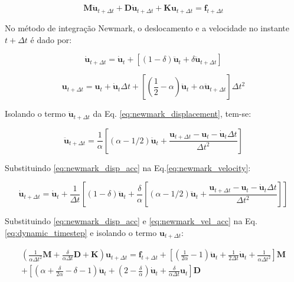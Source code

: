 \begin{equation} \label{eq:dynamic_timestep}
\pmb{M}\ddot{\pmb{u}}_{t + \Delta t} + \pmb{D}\dot{\pmb{u}}_{t + \Delta t} + \pmb{K}\pmb{u}_{t + \Delta t} = \pmb{f}_{t + \Delta t}
\end{equation}

No método de integração Newmark, o deslocamento e a velocidade no instante $t + \Delta t$ é dado por:

\begin{equation}\label{eq:newmark_velocity}
\dot{\pmb{u}}_{t + \Delta t} = \dot{\pmb{u}}_{t} + \left[\left(1 - \delta\right)\ddot{\pmb{u}}_{t} + \delta \ddot{\pmb{u}}_{t + \Delta t} \right]
\end{equation}

 \begin{equation}\label{eq:newmark_displacement}
\pmb{u}_{t + \Delta t} = \pmb{u}_{t} + \dot{\pmb{u}}_{t}\Delta t + \left[\left(\frac{1}{2} - \alpha\right) \ddot{\pmb{u}}_{t} + \alpha \ddot{\pmb{u}}_{t + \Delta  t}\right] \Delta t^{2}
\end{equation}

Isolando o termo $\ddot{\pmb{u}}_{t+\Delta t}$ da Eq. \ref{eq:newmark_displacement}, tem-se:

\begin{equation}\label{eq:newmark_disp_acc}
\ddot{\pmb{u}}_{t + \Delta t} = \frac{1}{\alpha}\left[\left(\alpha - 1/2\right)\ddot{\pmb{u}}_t + \frac{\pmb{u}_{t + \Delta t} - \pmb{u}_{t} - \dot{\pmb{u}}_{t}\Delta t }{\Delta t^{2}}\right]
\end{equation}

Substituindo \ref{eq:newmark_disp_acc} na Eq.\ref{eq:newmark_velocity}:

\begin{equation}\label{eq:newmark_vel_acc}
\dot{\pmb{u}}_{t + \Delta t} = \dot{\pmb{u}}_{t} + \frac{1}{\Delta t}\left[\left(1-\delta\right)\ddot{\pmb{u}}_{t} + \frac{\delta}{\alpha}\left[\left(\alpha - 1/2\right)\ddot{\pmb{u}}_{t} + \frac{\pmb{u}_{t + \Delta t} - \pmb{u}_{t} - \dot{\pmb{u}}_{t}\Delta t }{\Delta t^{2}} \right]\right]
\end{equation}

Substituindo \ref{eq:newmark_disp_acc} e \ref{eq:newmark_vel_acc} na Eq.\ref{eq:dynamic_timestep} e isolando o termo $\pmb{u}_{t + \Delta t}$:

\begin{equation}\label{eq:newmark_geral}
\begin{split}
\left(\frac{1}{\alpha \Delta t^{2}}\pmb{M} + \frac{\delta}{\alpha \Delta t} \pmb{D} + \pmb{K}\right) \pmb{u}_{t + \Delta t} = \pmb{f}_{t + \Delta t} + \left[\left(\frac{1}{2\alpha} - 1\right) \ddot{\pmb{u}}_{t} + \frac{1}{2\Delta t}\dot{\pmb{u}}_{t} + \frac{1}{\alpha \Delta t^{2}}\right]\pmb{M} \\
+ \left[\left(\alpha + \frac{\delta}{2\alpha} - \delta - 1\right)\ddot{\pmb{u}}_{t} + \left(2 - \frac{\delta}{\alpha}\right)\dot{\pmb{u}}_{t} + \frac{\delta}{\alpha\Delta t}\pmb{u}_{t}\right]\pmb{D}
\end{split}
\end{equation}

